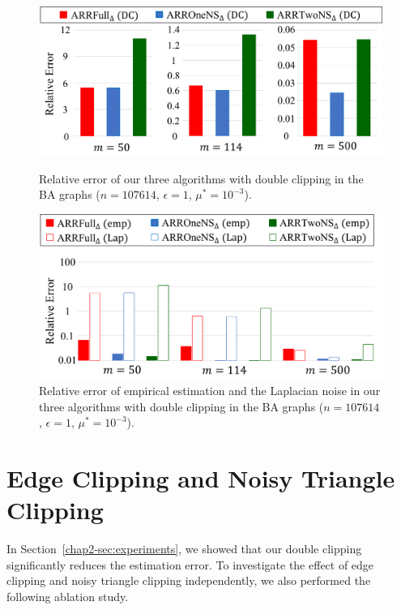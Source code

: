 {\begin{figure}[t]
  \centering
  \includegraphics[width=0.99\linewidth]{fig/resA_BAGraph.pdf}
  \vspace{-4mm}
  \caption{Relative error of our three algorithms with double clipping in the BA graphs ($n=107614$, $\epsilon=1$, $\mu^* = 10^{-3}$).}
  \label{chap2-fig:resA_BAGraph}
\vspace{5mm}
  \centering
  \includegraphics[width=0.95\linewidth]{fig/resA_BAGraph_emp_Lap.pdf}
  \vspace{-4mm}
  \caption{Relative error of empirical estimation and the Laplacian noise in our three algorithms with double clipping in the BA graphs ($n=107614$, $\epsilon=1$, $\mu^* = 10^{-3}$).}
  \label{chap2-fig:resA_BAGraph_emp_Lap}
\end{figure}

\section{Edge Clipping and Noisy Triangle Clipping}
\label{chap2-sec:EC_DC}
In Section~\ref{chap2-sec:experiments}, we showed that our double clipping significantly reduces the estimation error.
To investigate the effect of
edge clipping and noisy triangle clipping independently, we also performed the following ablation study.

}
